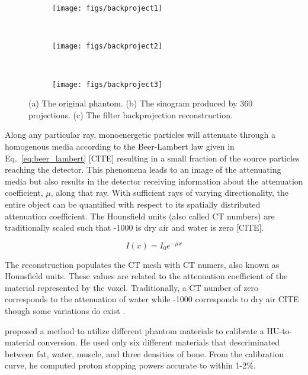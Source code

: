 \begin{figure}
    \centering
    \begin{subfigure}[b]{0.38\textwidth}
        \texttt{[image: figs/backproject1]}
        \caption{}
        \label{fig:beamconexy}
    \end{subfigure}
    ~
    \begin{subfigure}[b]{0.19\textwidth}
        \texttt{[image: figs/backproject2]}
        \caption{}
        \label{fig:beamfanxy}
    \end{subfigure}
    ~
    \begin{subfigure}[b]{0.38\textwidth}
        \texttt{[image: figs/backproject3]}
        \caption{}
        \label{fig:subsweep_general3}
    \end{subfigure}
    \caption{(a) The original phantom. (b) The sinogram produced by 360 projections. (c) The filter backprojection reconstruction.}\label{fig:backprojection}
\end{figure}

Along any particular ray, monoenergetic particles will attenuate through a homogenous media according to the Beer-Lambert law given in Eq.~\ref{eq:beer_lambert} [CITE] resulting in a small fraction of the source particles reaching the detector. This phenomena leads to an image of the attenuating media but also results in the detector receiving information about the attenuation coefficient, $\mu$, along that ray. With sufficient rays of varying directionality, the entire object can be quantified with respect to its spatially distributed attenuation coefficient. The Hounsfield units (also called CT numbers) are traditionally scaled such that -1000 is dry air and water is zero [CITE].

\begin{equation}\label{eq:beer_lambert}
I(x) = I_0 e^{-\mu x}
\end{equation}

The reconstruction populates the CT mesh with CT numers, also known as Hounsfield units. These values are related to the attenuation coefficient of the material represented by the voxel. Traditionally, a CT number of zero corresponds to the attenuation of water while -1000 corresponds to dry air CITE though some variations do exist \citep{ref:plessisf} \citep{ref:sawc}.

\citet{ref:schneideru} proposed a method to utilize different phantom materials to calibrate a HU-to-material conversion. He used only six different materials that descriminated between fat, water, muscle, and three densities of bone. From the calibration curve, he computed proton stopping powers accurate to within 1-2\%.

